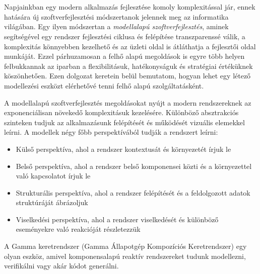 \chapter{\bevezetes}

Napjainkban egy modern alkalmazás fejlesztése komoly komplexitással jár, ennek hatására új szoftverfejlesztési módszertanok jelennek meg az informatika világában. Egy ilyen módszertan a \textit{modellalapú szoftverfejlesztés}, aminek segítségével egy rendszer fejlesztési ciklusa és felépítése transzparenssé válik, a komplexitás könnyebben kezelhető és az üzleti oldal is átláthatja a fejlesztői oldal munkáját. Ezzel párhuzamosan a felhő alapú megoldások is egyre több helyen felbukkannak az iparban a flexibilitásuk, hatékonyságuk és stratégiai értéküknek köszönhetően. Ezen dolgozat keretein belül bemutatom, hogyan lehet egy létező modellezési eszközt elérhetővé tenni felhő alapú szolgáltatásként.

A modellalapú szoftverfejlesztés megoldásokat nyújt a modern rendszereknek az exponenciálisan növekedő komplexitásuk kezelésére. Különböző absztrakciós szinteken tudjuk az alkalmazásunk felépítését és működését vizuális elemekkel leírni. A modellek négy főbb perspektívából tudják a rendszert leírni\cite{cs1}:

 \begin{itemize}
 	\item Külső perspektíva, ahol a rendszer kontextusát és környezetét írjuk le
 	\item Belső perspektíva, ahol a rendszer belső komponensei közti és a környezettel való kapcsolatot írjuk le
 	\item Strukturális perspektíva, ahol a rendszer felépítését és a feldolgozott adatok struktúráját ábrázoljuk
 	\item Viselkedési perspektíva, ahol a rendszer viselkedését és különböző eseményekre való reakcióját részletezzük
 \end{itemize}
A Gamma keretrendszer \cite{DBLP:conf/icse/MolnarGVMV18} (Gamma Állapotgép Kompozíciós Keretrendszer) egy olyan eszköz, amivel komponensalapú reaktív rendszereket tudunk modellezni, verifikálni vagy akár kódot generálni.

